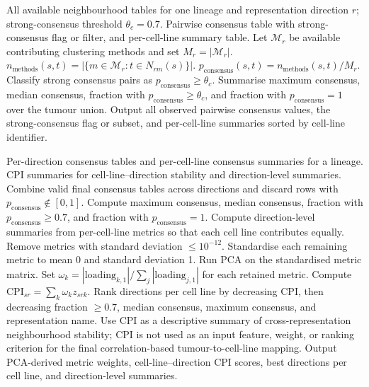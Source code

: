 \begin{algorithm}[H]
\caption{Within-direction consensus aggregation}
\label{alg:supp_within_direction_consensus}
\small
\begin{algorithmic}[1]
\Require All available neighbourhood tables for one lineage and representation direction \(r\); strong-consensus threshold \(\theta_c=0.7\).
\Ensure Pairwise consensus table with strong-consensus flag or filter, and per-cell-line summary table.
\State Let \(\mathcal{M}_r\) be available contributing clustering methods and set \(M_r=|\mathcal{M}_r|\).
  \State \(n_{\mathrm{methods}}(s,t)=|\{m\in\mathcal{M}_r:t\in N_{rm}(s)\}|\).
  \State \(p_{\mathrm{consensus}}(s,t)=n_{\mathrm{methods}}(s,t)/M_r\).
\EndFor
\State Classify strong consensus pairs as \(p_{\mathrm{consensus}}\geq\theta_c\).
  \State Summarise maximum consensus, median consensus, fraction with \(p_{\mathrm{consensus}}\geq\theta_c\), and fraction with \(p_{\mathrm{consensus}}=1\) over the tumour union.
\EndFor
\State Output all observed pairwise consensus values, the strong-consensus flag or subset, and per-cell-line summaries sorted by cell-line identifier.
\end{algorithmic}
\end{algorithm}

\begin{algorithm}[H]
\caption{Cross-direction CPI stability summaries}
\label{alg:supp_cross_direction_cpi}
\small
\begin{algorithmic}[1]
\Require Per-direction consensus tables and per-cell-line consensus summaries for a lineage.
\Ensure CPI summaries for cell-line--direction stability and direction-level summaries.
\State Combine valid final consensus tables across directions and discard rows with \(p_{\mathrm{consensus}}\notin[0,1]\).
  \State Compute maximum consensus, median consensus, fraction with \(p_{\mathrm{consensus}}\geq0.7\), and fraction with \(p_{\mathrm{consensus}}=1\).
\EndFor
\State Compute direction-level summaries from per-cell-line metrics so that each cell line contributes equally.
\State Remove metrics with standard deviation \(\leq10^{-12}\).
\State Standardise each remaining metric to mean 0 and standard deviation 1.
\State Run PCA on the standardised metric matrix.
\State Set \(\omega_k=|\mathrm{loading}_{k,1}|/\sum_j|\mathrm{loading}_{j,1}|\) for each retained metric.
\State Compute \(\mathrm{CPI}_{sr}=\sum_k\omega_k z_{srk}\).
\State Rank directions per cell line by decreasing CPI, then decreasing fraction \(\geq0.7\), median consensus, maximum consensus, and representation name.
\State Use CPI as a descriptive summary of cross-representation neighbourhood stability; CPI is not used as an input feature, weight, or ranking criterion for the final correlation-based tumour-to-cell-line mapping.
\State Output PCA-derived metric weights, cell-line--direction CPI scores, best directions per cell line, and direction-level summaries.
\end{algorithmic}
\end{algorithm}

